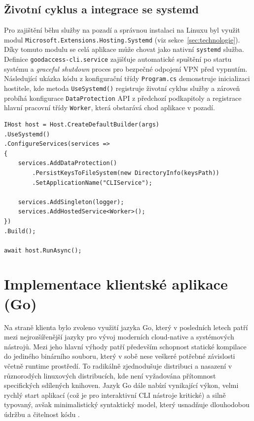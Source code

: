\subsection{Životní cyklus a integrace se systemd}
Pro zajištění běhu služby na pozadí a správnou instalaci na Linuxu byl využit modul \texttt{Microsoft.\allowbreak Extensions.\allowbreak Hosting.\allowbreak Systemd} (viz sekce~\ref{sec:technologie}). Díky tomuto modulu se celá aplikace může chovat jako nativní \texttt{systemd} služba. Definice \texttt{goodaccess-cli.service} zajišťuje automatické spuštění po startu systému a \textit{graceful shutdown} proces pro bezpečné odpojení VPN před vypnutím. Následující ukázka kódu z konfigurační třídy \texttt{Program.cs} demonstruje inicializaci hostitele, kde metoda \texttt{UseSystemd()} registruje životní cyklus služby a zároveň probíhá konfigurace \texttt{DataProtection} API z předchozí podkapitoly a registrace hlavní pracovní třídy \texttt{Worker}, která obstarává chod aplikace v pozadí.

\noindent\begin{minipage}{\linewidth}
\begin{lstlisting}[language=CSharp, stringstyle=\itshape]
IHost host = Host.CreateDefaultBuilder(args)
.UseSystemd()
.ConfigureServices(services =>
{
    services.AddDataProtection()
        .PersistKeysToFileSystem(new DirectoryInfo(keysPath))
        .SetApplicationName("CLIService");

    services.AddSingleton(logger);
    services.AddHostedService<Worker>();
})
.Build();

await host.RunAsync();
\end{lstlisting}
\end{minipage}

\section{Implementace klientské aplikace (Go)}
Na straně klienta bylo zvoleno využití jazyka Go, který v posledních letech patří mezi nejrozšířenější jazyky pro vývoj moderních cloud-native a systémových nástrojů. Mezi jeho hlavní výhody patří především schopnost statické kompilace do jediného binárního souboru, který v sobě nese veškeré potřebné závislosti včetně runtime prostředí. To radikálně zjednodušuje distribuci a nasazení v různorodých linuxových distribucích, kde není vyžadována přítomnost specifických sdílených knihoven. Jazyk Go dále nabízí vynikající výkon, velmi rychlý start aplikací (což je pro interaktivní CLI nástroje kritické) a silně typovaný, avšak minimalistický syntaktický model, který usnadňuje dlouhodobou údržbu a čitelnost kódu \cite{donovan_go}.

